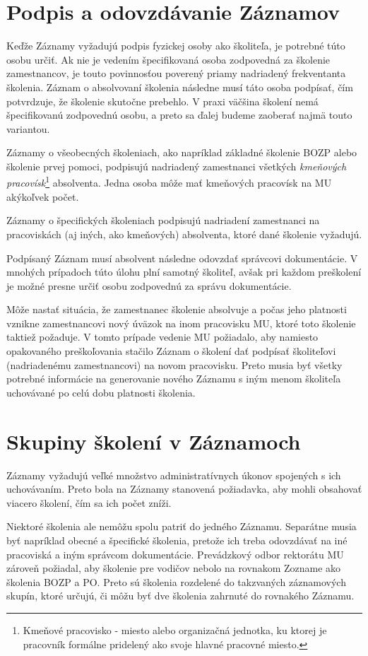\documentclass[
  digital,     %
  oneside,     %
  nosansbold,  %
  nocolorbold, %
  lof,         %
  nolot,         %
]{fithesis4}
\begin{document}
\section{Podpis a odovzdávanie Záznamov}
Keďže Záznamy vyžadujú podpis fyzickej osoby ako školiteľa, je potrebné túto osobu určiť. Ak nie je vedením špecifikovaná osoba zodpovedná za školenie zamestnancov, je touto povinnosťou poverený priamy nadriadený frekventanta školenia. Záznam o absolvovaní školenia následne musí táto osoba podpísať, čím potvrdzuje, že školenie skutočne prebehlo. V praxi väčšina školení nemá špecifikovanú zodpovednú osobu, a preto sa ďalej budeme zaoberať najmä touto variantou.

Záznamy o všeobecných školeniach, ako napríklad základné školenie BOZP alebo školenie prvej pomoci, podpisujú nadriadený zamestnanci všetkých \textit{kmeňových pracovísk}\footnote{Kmeňové pracovisko - miesto alebo organizačná jednotka, ku ktorej je pracovník formálne pridelený ako svoje hlavné pracovné miesto.} absolventa. Jedna osoba môže mať kmeňových pracovísk na MU akýkoľvek počet.

Záznamy o špecifických školeniach podpisujú nadriadení zamestnanci na pracoviskách (aj iných, ako kmeňových) absolventa, ktoré dané školenie vyžadujú.

Podpísaný Záznam musí absolvent následne odovzdať správcovi dokumentácie. V mnohých prípadoch túto úlohu plní samotný školiteľ, avšak pri každom preškolení je možné presne určiť osobu zodpovednú za správu dokumentácie.

Môže nastať situácia, že zamestnanec školenie absolvuje a počas jeho platnosti vznikne zamestnancovi nový úväzok na inom pracovisku MU, ktoré toto školenie taktiež požaduje. V tomto prípade vedenie MU požiadalo, aby namiesto opakovaného preškoľovania stačilo Záznam o školení dať podpísať školiteľovi (nadriadenému zamestnancovi) na novom pracovisku. Preto musia byť všetky potrebné informácie na generovanie nového Záznamu s iným menom školiteľa uchovávané po celú dobu platnosti školenia.

\section{Skupiny školení v Záznamoch}
Záznamy vyžadujú veľké množstvo administratívnych úkonov spojených s ich uchovávaním. Preto bola na Záznamy stanovená požiadavka, aby mohli obsahovať viacero školení, čím sa ich počet zníži.

Niektoré školenia ale nemôžu spolu patriť do jedného Záznamu. Separátne musia byť napríklad obecné a špecifické školenia, pretože ich treba odovzdávať na iné pracoviská a iným správcom dokumentácie. Prevádzkový odbor rektorátu MU zároveň požiadal, aby školenie pre vodičov nebolo na rovnakom Zozname ako školenia BOZP a PO. Preto sú školenia rozdelené do takzvaných záznamových skupín, ktoré určujú, či môžu byť dve školenia zahrnuté do rovnakého Záznamu.
\end{document}

